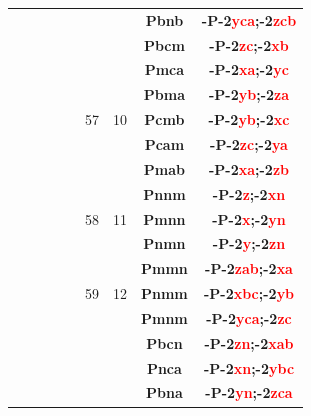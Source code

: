 \documentclass{article}      %
\begin{document}
\begin{small}
\begin{longtable}[c]{|c|c|c|c|c|c|c|c|c|}
          &  & & & &  & &\textbf{Pbnb}         &\textbf{-P-2\textcolor{red}{yca};-2\textcolor{red}{zcb}}\\\cline{6-9}     
          &  & & & &  & &\textbf{Pbcm}         &\textbf{-P-2\textcolor{red}{zc};-2\textcolor{red}{xb}}\\\cline{8-9}       
          &  & & & &  & &\textbf{Pmca}         &\textbf{-P-2\textcolor{red}{xa};-2\textcolor{red}{yc}}\\\cline{8-9}       
          &  & & & &  & &\textbf{Pbma}         &\textbf{-P-2\textcolor{red}{yb};-2\textcolor{red}{za}}\\\cline{8-9}       
	  &  & & & &\textrm{57}  &\textrm{10} &\textbf{Pcmb}         &\textbf{-P-2\textcolor{red}{yb};-2\textcolor{red}{xc}}\\\cline{8-9}       
          &  & & & &  & &\textbf{Pcam}         &\textbf{-P-2\textcolor{red}{zc};-2\textcolor{red}{ya}}\\\cline{8-9}       
          &  & & & &  & &\textbf{Pmab}         &\textbf{-P-2\textcolor{red}{xa};-2\textcolor{red}{zb}}\\\cline{6-9}       
          &  & & & &  & &\textbf{Pnnm}         &\textbf{-P-2\textcolor{red}{z};-2\textcolor{red}{xn}}\\\cline{8-9}        
	  &  & & & &\textrm{58}  &\textrm{11} &\textbf{Pmnn}         &\textbf{-P-2\textcolor{red}{x};-2\textcolor{red}{yn}}\\\cline{8-9}        
          &  & & & &  & &\textbf{Pnmn}         &\textbf{-P-2\textcolor{red}{y};-2\textcolor{red}{zn}}\\\cline{6-9}        
          &  & & & &  & &\textbf{Pmmn}         &\textbf{-P-2\textcolor{red}{zab};-2\textcolor{red}{xa}}\\\cline{8-9}      
	  &  & & & &\textrm{59}  &\textrm{12} &\textbf{Pnmm}         &\textbf{-P-2\textcolor{red}{xbc};-2\textcolor{red}{yb}}\\\cline{8-9}      
          &  & & & &  & &\textbf{Pmnm}         &\textbf{-P-2\textcolor{red}{yca};-2\textcolor{red}{zc}}\\\cline{6-9}      
          &  & & & &  & &\textbf{Pbcn}         &\textbf{-P-2\textcolor{red}{zn};-2\textcolor{red}{xab}}\\\cline{8-9}      
          &  & & & &  & &\textbf{Pnca}         &\textbf{-P-2\textcolor{red}{xn};-2\textcolor{red}{ybc}}\\\cline{8-9}      
          &  & & & &  & &\textbf{Pbna}         &\textbf{-P-2\textcolor{red}{yn};-2\textcolor{red}{zca}}\\\cline{8-9}      

\end{longtable}
\end{small}
\end{document}
